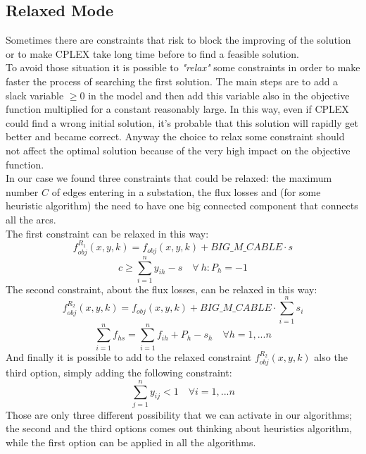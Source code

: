 \subsection{Relaxed Mode}
Sometimes there are constraints that risk to block the improving of the solution or to make \textsc{CPLEX} take long time before to find a feasible solution. \\
To avoid those situation it is possible to \textit{"relax"} some constraints in order to make faster the process of searching the first solution. The main steps are to add a slack variable $\geq 0$ in the model and then add this variable also in the objective function multiplied for a constant reasonably large. In this way, even if \textsc{CPLEX} could find a wrong initial solution, it’s probable that this solution will rapidly get better and became correct. Anyway the choice to relax some constraint should not affect the optimal solution because of the very high impact on the objective function. \\
In our case we found three constraints that could be relaxed: the maximum number $C$ of edges entering in a substation, the flux losses and (for some heuristic algorithm) the need to have one big connected component that connects all the arcs. \\
The first constraint can be relaxed in this way:
\[
f^{R_1}_{obj} (x,y,k) = f_{obj} (x,y,k) + BIG\_M\_CABLE \cdot s
\]
\[
c \geq \sum^n_{i=1} y_{ih} -s \quad \forall \ h : P_h = -1
\]
The second constraint, about the flux losses, can be relaxed in this way:
\[
f^{R_2}_{obj} (x,y,k) = f_{obj} (x,y,k) + BIG\_M\_CABLE \cdot \sum^n_{i=1} s_i
\]
\[
\sum^n_{i=1} f_{hs} = \sum^n_{i=1} f_{ih} + P_h - s_h \quad \forall h = 1, ... n
\]
And finally it is possible to add to the relaxed constraint $f^{R_2}_{obj} (x,y,k)$ also the third option, simply adding the following constraint: 
\[
\sum^n_{j=1} y_{ij} < 1 \quad \forall i = 1, ... n
\]
Those are only three different possibility that we can activate in our algorithms; the second and the third options comes out thinking about heuristics algorithm, while the first option can be applied in all the algorithms. 
